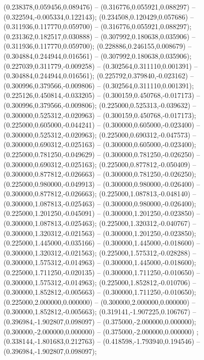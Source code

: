  (0.238378,0.059456,0.089476) -- (0.316776,0.055921,0.088297) -- (0.322594,-0.005334,0.122143);
 (0.234508,0.120429,0.057686) -- (0.311936,0.117770,0.059700) -- (0.316776,0.055921,0.088297);
 (0.231362,0.182517,0.030888) -- (0.307992,0.180638,0.035906) -- (0.311936,0.117770,0.059700);
 (0.228886,0.246155,0.008679) -- (0.304884,0.244944,0.016561) -- (0.307992,0.180638,0.035906);
 (0.227039,0.311779,-0.009258) -- (0.302564,0.311110,0.001391) -- (0.304884,0.244944,0.016561);
 (0.225792,0.379840,-0.023162) -- (0.300996,0.379566,-0.009806) -- (0.302564,0.311110,0.001391);
 (0.225126,0.450814,-0.033205) -- (0.300159,0.450768,-0.017173) -- (0.300996,0.379566,-0.009806);
 (0.225000,0.525313,-0.039632) -- (0.300000,0.525312,-0.020963) -- (0.300159,0.450768,-0.017173);
 (0.225000,0.605000,-0.044241) -- (0.300000,0.605000,-0.023400) -- (0.300000,0.525312,-0.020963);
 (0.225000,0.690312,-0.047573) -- (0.300000,0.690312,-0.025163) -- (0.300000,0.605000,-0.023400);
 (0.225000,0.781250,-0.049629) -- (0.300000,0.781250,-0.026250) -- (0.300000,0.690312,-0.025163);
 (0.225000,0.877812,-0.050409) -- (0.300000,0.877812,-0.026663) -- (0.300000,0.781250,-0.026250);
 (0.225000,0.980000,-0.049913) -- (0.300000,0.980000,-0.026400) -- (0.300000,0.877812,-0.026663);
 (0.225000,1.087813,-0.048140) -- (0.300000,1.087813,-0.025463) -- (0.300000,0.980000,-0.026400);
 (0.225000,1.201250,-0.045091) -- (0.300000,1.201250,-0.023850) -- (0.300000,1.087813,-0.025463);
 (0.225000,1.320312,-0.040767) -- (0.300000,1.320312,-0.021563) -- (0.300000,1.201250,-0.023850);
 (0.225000,1.445000,-0.035166) -- (0.300000,1.445000,-0.018600) -- (0.300000,1.320312,-0.021563);
 (0.225000,1.575312,-0.028288) -- (0.300000,1.575312,-0.014963) -- (0.300000,1.445000,-0.018600);
 (0.225000,1.711250,-0.020135) -- (0.300000,1.711250,-0.010650) -- (0.300000,1.575312,-0.014963);
 (0.225000,1.852812,-0.010706) -- (0.300000,1.852812,-0.005663) -- (0.300000,1.711250,-0.010650);
 (0.225000,2.000000,0.000000) -- (0.300000,2.000000,0.000000) -- (0.300000,1.852812,-0.005663);
 (0.319141,-1.907225,0.106767) -- (0.396984,-1.902807,0.098097) -- (0.375000,-2.000000,0.000000);
 (0.300000,-2.000000,0.000000) -- (0.375000,-2.000000,0.000000) ;
 (0.338144,-1.801683,0.212763) -- (0.418598,-1.793940,0.194546) -- (0.396984,-1.902807,0.098097);
